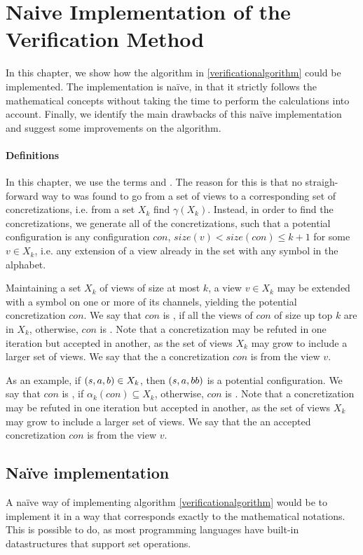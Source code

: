 \section{Naive Implementation of the Verification Method}
\label{naive}
In this chapter, we show how the algorithm in \ref{verificationalgorithm} could be implemented. The implementation is naïve, in that it strictly follows the mathematical concepts without taking the time to perform the calculations into account. Finally, we identify the main drawbacks of this naïve implementation and suggest some improvements on the algorithm.

\paragraph{Definitions}
In this chapter, we use the terms  and . The reason for this is that no straigh-forward way to was found to go from a set of views to a corresponding set of concretizations, i.e. from a set $X_k$ find $\gamma(X_k)$. Instead, in order to find the concretizations, we generate all of the  concretizations, such that a potential configuration is any configuration $con$, $size(v) < size(con) \leq k+1$ for some $v \in X_k$, i.e. any extension of a view already in the set with any symbol in the alphabet.

Maintaining a set $X_k$ of views of size at most $k$, a view $v\in X_k$ may be extended with a symbol on one or more of its channels, yielding the potential concretization $con$. We say that $con$ is , if all the views of $con$ of size up top $k$ are in $X_k$, otherwise, $con$ is . Note that a concretization may be refuted in one iteration but accepted in another, as the set of views $X_k$ may grow to include a larger set of views. We say that the a concretization $con$ is  from the view $v$.

As an example, if $(s, a, b) \in X_k$, then $(s, a, bb)$ is a potential configuration. We say that $con$ is , if $\alpha_k(con) \subseteq X_k$, otherwise, $con$ is . Note that a concretization may be refuted in one iteration but accepted in another, as the set of views $X_k$ may grow to include a larger set of views. We say that the an accepted concretization $con$ is  from the view $v$.

\subsection{Naïve implementation}
\label{apost}
A naïve way of implementing algorithm \ref{verificationalgorithm} would be to implement it in a way that corresponds exactly to the mathematical notations. This is possible to do, as most programming languages have built-in datastructures that support set operations.

